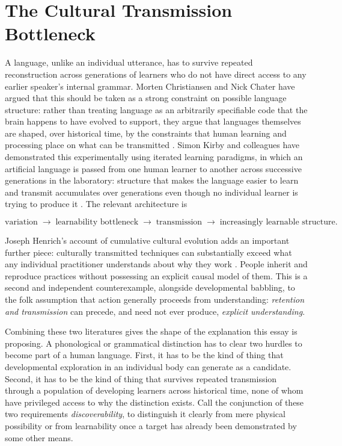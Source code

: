 \documentclass[11pt]{article}
\begin{document}
\section{The Cultural Transmission Bottleneck}

A language, unlike an individual utterance, has to survive repeated reconstruction across generations of learners who do not have direct access to any earlier speaker's internal grammar. Morten Christiansen and Nick Chater have argued that this should be taken as a strong constraint on possible language structure: rather than treating language as an arbitrarily specifiable code that the brain happens to have evolved to support, they argue that languages themselves are shaped, over historical time, by the constraints that human learning and processing place on what can be transmitted \citep{christiansen2008}. Simon Kirby and colleagues have demonstrated this experimentally using iterated learning paradigms, in which an artificial language is passed from one human learner to another across successive generations in the laboratory: structure that makes the language easier to learn and transmit accumulates over generations even though no individual learner is trying to produce it \citep{kirby2008}. The relevant architecture is

\[
\text{variation} \;\rightarrow\; \text{learnability bottleneck} \;\rightarrow\; \text{transmission} \;\rightarrow\; \text{increasingly learnable structure.}
\]

Joseph Henrich's account of cumulative cultural evolution adds an important further piece: culturally transmitted techniques can substantially exceed what any individual practitioner understands about why they work \citep{henrich2015}. People inherit and reproduce practices without possessing an explicit causal model of them. This is a second and independent counterexample, alongside developmental babbling, to the folk assumption that action generally proceeds from understanding: \emph{retention and transmission} can precede, and need not ever produce, \emph{explicit understanding}.

Combining these two literatures gives the shape of the explanation this essay is proposing. A phonological or grammatical distinction has to clear two hurdles to become part of a human language. First, it has to be the kind of thing that developmental exploration in an individual body can generate as a candidate. Second, it has to be the kind of thing that survives repeated transmission through a population of developing learners across historical time, none of whom have privileged access to why the distinction exists. Call the conjunction of these two requirements \emph{discoverability}, to distinguish it clearly from mere physical possibility or from learnability once a target has already been demonstrated by some other means.
\end{document}
